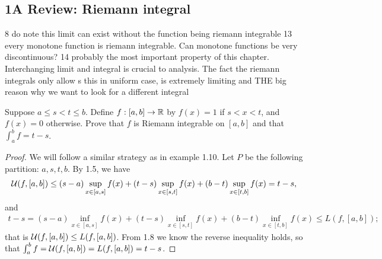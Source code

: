 \subsection{1A Review: Riemann integral}

8 do note this limit can exist without the function being riemann integrable
13 every monotone function is riemann integrable. Can monotone functions be very discontinuous?
14 probably the most important property of this chapter. Interchanging limit and integral is crucial to analysis. The fact the riemann integrals only allow s this in uniform case, is extremely limiting and THE big reason why we want to look for a different integral

\begin{exercise}{2}
Suppose $a \leq s < t \leq b$.
Define $f:[a,b]\to\mathbb{R}$ by $f(x)=1$ if $s<x<t$, and $f(x)=0$ otherwise.
Prove that $f$ is Riemann integrable on $[a,b]$ and that $\int_a^b f = t-s$.
\end{exercise}
\begin{proof}
We will follow a similar strategy as in example 1.10.
Let $P$ be the following partition: $a,s,t,b$.
By 1.5, we have
\begin{align*}
    \mathcal{U}(f,[a,b])
    \leq (s-a)\sup_{x\in[a,s]} f(x) 
    + (t-s)\sup_{x\in[s,t]} f(x) 
    + (b-t)\sup_{x\in[t,b]} f(x)
    = t-s,
\end{align*}
and
\begin{align*}
    t-s
    =(s-a)\inf_{x\in[a,s]} f(x) 
    + (t-s)\inf_{x\in[s,t]} f(x) 
    + (b-t)\inf_{x\in[t,b]} f(x)
    \leq L(f,[a,b]);
\end{align*}
that is $\mathcal{U}(f,[a,b]) \leq L(f,[a,b])$.
From 1.8 we know the reverse inequality holds, so that $\int_a^b f = \mathcal{U}(f,[a,b]) = L(f,[a,b]) = t-s$.
\end{proof} 

